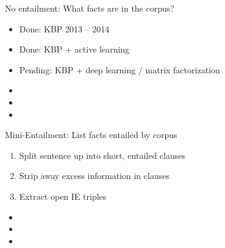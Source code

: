 \begin{frame}{No entailment: What facts are in the corpus?}
\vspace{2em}

\pause
\begin{itemize}
  \item Done: KBP 2013 -- 2014
  \item Done: KBP + active learning
  \item Pending: KBP + deep learning / matrix factorization
\end{itemize}
\vspace{2em}
\pause

\begin{itemize}
  \item {}
  \item {}
  \item {}
\end{itemize}
\end{frame}

\begin{frame}{Mini-Entailment: List facts entailed by corpus}
\vspace{2em}

\pause
\begin{enumerate}
  \item Split sentence up into short, entailed clauses
  \item Strip away excess information in clauses
  \item Extract open IE triples
\end{enumerate}
\vspace{2em}
\pause

\begin{itemize}
  \item {}
  \item {}
  \item {}
\end{itemize}
\end{frame}

